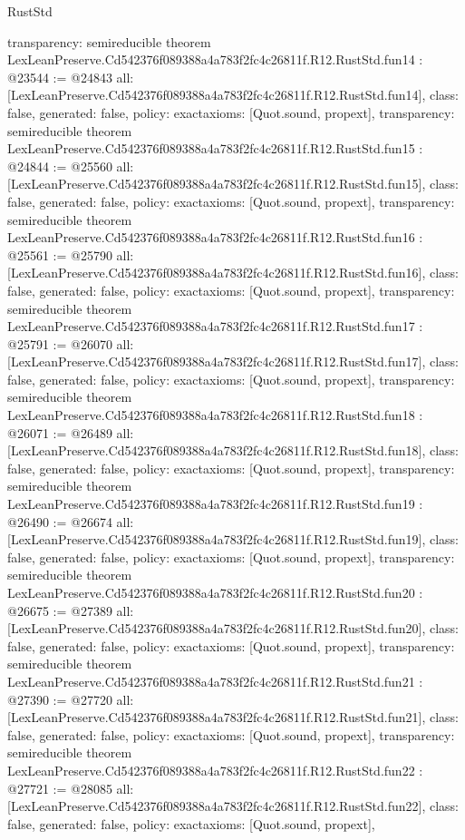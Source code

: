 \begin{lexlean}{RustStd}
\begin{coremodule}
{  transparency: semireducible
}
theorem LexLeanPreserve.Cd542376f089388a4a783f2fc4c26811f.R12.RustStd.fun14 : @23544 := @24843 {
  all: [LexLeanPreserve.Cd542376f089388a4a783f2fc4c26811f.R12.RustStd.fun14],
  class: false,
  generated: false,
  policy: exact{axioms: [Quot.sound, propext]},
  transparency: semireducible
}
theorem LexLeanPreserve.Cd542376f089388a4a783f2fc4c26811f.R12.RustStd.fun15 : @24844 := @25560 {
  all: [LexLeanPreserve.Cd542376f089388a4a783f2fc4c26811f.R12.RustStd.fun15],
  class: false,
  generated: false,
  policy: exact{axioms: [Quot.sound, propext]},
  transparency: semireducible
}
theorem LexLeanPreserve.Cd542376f089388a4a783f2fc4c26811f.R12.RustStd.fun16 : @25561 := @25790 {
  all: [LexLeanPreserve.Cd542376f089388a4a783f2fc4c26811f.R12.RustStd.fun16],
  class: false,
  generated: false,
  policy: exact{axioms: [Quot.sound, propext]},
  transparency: semireducible
}
theorem LexLeanPreserve.Cd542376f089388a4a783f2fc4c26811f.R12.RustStd.fun17 : @25791 := @26070 {
  all: [LexLeanPreserve.Cd542376f089388a4a783f2fc4c26811f.R12.RustStd.fun17],
  class: false,
  generated: false,
  policy: exact{axioms: [Quot.sound, propext]},
  transparency: semireducible
}
theorem LexLeanPreserve.Cd542376f089388a4a783f2fc4c26811f.R12.RustStd.fun18 : @26071 := @26489 {
  all: [LexLeanPreserve.Cd542376f089388a4a783f2fc4c26811f.R12.RustStd.fun18],
  class: false,
  generated: false,
  policy: exact{axioms: [Quot.sound, propext]},
  transparency: semireducible
}
theorem LexLeanPreserve.Cd542376f089388a4a783f2fc4c26811f.R12.RustStd.fun19 : @26490 := @26674 {
  all: [LexLeanPreserve.Cd542376f089388a4a783f2fc4c26811f.R12.RustStd.fun19],
  class: false,
  generated: false,
  policy: exact{axioms: [Quot.sound, propext]},
  transparency: semireducible
}
theorem LexLeanPreserve.Cd542376f089388a4a783f2fc4c26811f.R12.RustStd.fun20 : @26675 := @27389 {
  all: [LexLeanPreserve.Cd542376f089388a4a783f2fc4c26811f.R12.RustStd.fun20],
  class: false,
  generated: false,
  policy: exact{axioms: [Quot.sound, propext]},
  transparency: semireducible
}
theorem LexLeanPreserve.Cd542376f089388a4a783f2fc4c26811f.R12.RustStd.fun21 : @27390 := @27720 {
  all: [LexLeanPreserve.Cd542376f089388a4a783f2fc4c26811f.R12.RustStd.fun21],
  class: false,
  generated: false,
  policy: exact{axioms: [Quot.sound, propext]},
  transparency: semireducible
}
theorem LexLeanPreserve.Cd542376f089388a4a783f2fc4c26811f.R12.RustStd.fun22 : @27721 := @28085 {
  all: [LexLeanPreserve.Cd542376f089388a4a783f2fc4c26811f.R12.RustStd.fun22],
  class: false,
  generated: false,
  policy: exact{axioms: [Quot.sound, propext]},
}
\end{coremodule}
\end{lexlean}
